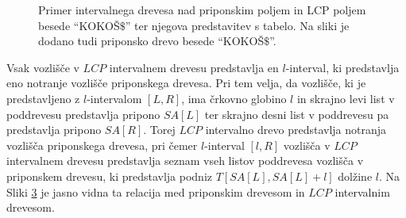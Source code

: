 \begin{figure}[htb]
    \begin{subfigure}[T]{0.45\linewidth}        
        
        \centering
        \subcaption*{}
        \label{fig:aSADrevo}
    \end{subfigure}
    \hfill
    \begin{subfigure}[T]{0.45\linewidth}        
        
        \centering
        \subcaption*{}
        \label{fig:aSAPolje}
    \end{subfigure}
   
    \caption{Primer intervalnega drevesa nad priponskim poljem in LCP poljem besede \enquote{KOKOŠ$\$$} ter njegova predstavitev s tabelo. Na sliki je dodano tudi priponsko drevo besede \enquote{KOKOŠ$\$$}.} 
    \label{fig:intervalTree}
\end{figure}

Vsak vozlišče v $LCP$ intervalnem drevesu predstavlja en $l$-interval, ki predstavlja eno notranje vozlišče priponskega drevesa. Pri tem velja, da vozlišče, ki je predstavljeno z $l$-intervalom $[L,R]$, ima črkovno globino $l$ in skrajno levi list v poddrevesu predstavlja pripono $SA[L]$ ter skrajno desni list v poddrevesu pa predstavlja pripono $SA[R]$. Torej $LCP$ intervalno drevo predstavlja notranja vozlišča priponskega drevesa, pri čemer $l$-interval $[l,R]$ vozlišča v $LCP$ intervalnem drevesu predstavlja seznam vseh listov poddrevesa vozlišča v priponskem drevesu, ki predstavlja podniz $T[SA[L],SA[L]+l]$ dolžine $l$. Na Sliki \ref{fig:intervalTree} je jasno vidna ta relacija med priponskim drevesom in $LCP$ intervalnim drevesom.

